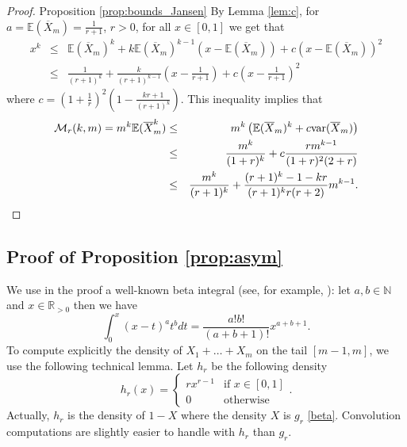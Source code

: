 \documentclass{article}
\theoremstyle{plain}
\newcommand{\N}{{\mathbb N}}
\newcommand{\E}{{\mathbb E}}
\newcommand{\V}{{\mathcal M}}
\newcommand{\R}{{\mathbb R}}
\begin{document}
\begin{proof}{Proposition {\ref{prop:bounds_Jansen}}}
By Lemma \ref{lem:c}, for $a=\E(\overline{X}_m)=\frac{1}{r+1}$, $r>0$, for all $x\in [0,1]$ we get that
\begin{eqnarray*}
x^k &\le& \E(\overline{X}_m)^k+k\E(\overline{X}_m)^{k-1}\left(x-\E(\overline{X}_m)\right)+ c\left(x-\E(\overline{X}_m)\right)^2 \\
&\le& \frac{1}{(r+1)^k}+\frac{k}{(r+1)^{k-1}}\left(x-\frac{1}{r+1}\right) + c\left(x-\frac{1}{r+1}\right)^2 
\end{eqnarray*} 
where $c=(1+\frac{1}{r})^2\left(1-\frac{k r+1}{(r+1)^k} \right)$. This inequality implies that 
\begin{eqnarray*}
\V_r(k,m)=m^k\E(\overline{X}_m^k) &\le& m^k\left(\E(\overline{X}_m)^k+c {\rm var}(\overline{X}_m)\right) \\
&\le & \frac{m^k}{(1+r)^k}+c\frac{rm^{k-1}}{(1+r)^2(2+r)}\\
&\le & \frac{m^k}{(r+1)^k} + \frac{(r + 1)^k - 1 - k r}{(r + 1)^k r (r+2)} m^{k-1}.
\end{eqnarray*}
\end{proof}

\subsection{Proof of Proposition \ref{prop:asym}}

We use in the proof a well-known beta integral (see, for example, \cite{hbeta}): let $a, b\in \N$ and $x\in\R_{>0}$ then we have 
\begin{equation} \label{intbeta}
\int_{0}^{x}(x-t)^a t^b dt=\frac{a!b!}{(a+b+1)!}x^{a+b+1}.
\end{equation}
To compute explicitly the density of $X_1+\dots+X_m$ on the tail $[m-1,m]$, we use the following technical lemma. 
Let $h_r$ be the following density
\begin{equation} \label{hbeta}
h_r(x) = \begin{cases}
r x^{r-1} &\text{if }x\in[0,1]\\
0 &\text{otherwise}
\end{cases}.
\end{equation}
Actually, $h_r$ is the density of $1-X$ where the density $X$ is $g_r$ \eqref{beta}. Convolution computations are slightly easier to handle with $h_r$ than $g_r$.
\end{document}
